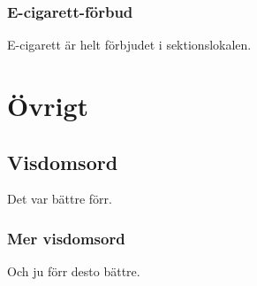 \documentclass{dgovdoc}
\begin{document}
\subsubsection{E-cigarett-förbud}
E-cigarett är helt förbjudet i sektionslokalen.

\section{Övrigt}

\subsection{Visdomsord}

Det var bättre förr.

\subsubsection{Mer visdomsord}

Och ju förr desto bättre.
\end{document}
